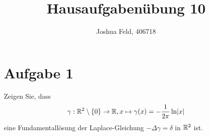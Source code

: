 \documentclass{exercise}
\institute{Applied and Computational Mathematics}
\title{Hausaufgabenübung 10}
\author{Joshua Feld, 406718}
\begin{document}
    \maketitle


    \section*{Aufgabe 1}
    
    \begin{problem}
        Zeigen Sie, dass
        \[
            \gamma: \R^2 \setminus \braces*{0} \to \R, x \mapsto \gamma\parentheses*{x} = -\frac{1}{2\pi}\ln\absolute*{x}
        \]
        eine Fundamentallösung der Laplace-Gleichung \(-\Delta\gamma = \delta\) in \(\mathbb{R}^2\) ist.
    \end{problem}
    
\end{document}
